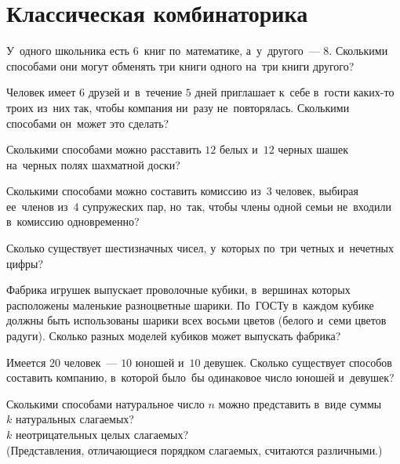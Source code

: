 
\section*{Классическая комбинаторика}


\begin{problems}

\item
У~одного школьника есть $6$~книг по~математике, а~у~другого~--- $8$.
Сколькими способами они могут обменять три книги одного на~три книги другого?

\item
Человек имеет $6$ друзей и~в~течение $5$ дней приглашает к~себе в~гости
каких-то троих из~них так, чтобы компания ни~разу не~повторялась.
Сколькими способами он~может это сделать?

\item
Сколькими способами можно расставить $12$ белых и~$12$ черных шашек на~черных
полях шахматной доски?

\item
Сколькими способами можно составить комиссию из~$3$ человек, выбирая ее~членов
из~$4$ супружеских пар, но~так, чтобы члены одной семьи не~входили в~комиссию
одновременно?

\item
Сколько существует шестизначных чисел, у~которых по~три четных и~нечетных
цифры?

\item
Фабрика игрушек выпускает проволочные кубики, в~вершинах которых расположены
маленькие разноцветные шарики.
По~ГОСТу в~каждом кубике должны быть использованы шарики всех восьми цветов
(белого и~семи цветов радуги).
Сколько разных моделей кубиков может выпускать фабрика?

\item
Имеется $20$ человек~--- $10$ юношей и~$10$ девушек.
Сколько существует способов составить компанию, в~которой было~бы одинаковое
число юношей и~девушек?

\item
Сколькими способами натуральное число $n$ можно представить в~виде суммы
\\
\subproblem $k$ натуральных слагаемых?
\\
\subproblem $k$ неотрицательных целых слагаемых?
\\
(Представления, отличающиеся порядком слагаемых, считаются различными.)

\end{problems}

